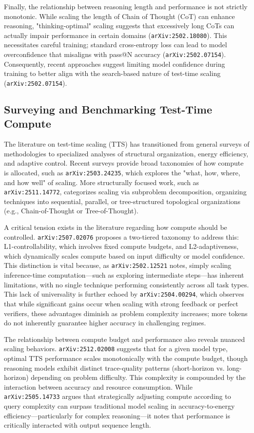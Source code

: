 \documentclass[11pt]{article}
\begin{document}
Finally, the relationship between reasoning length and performance is not strictly monotonic. While scaling the length of Chain of Thought (CoT) can enhance reasoning, "thinking-optimal" scaling suggests that excessively long CoTs can actually impair performance in certain domains (\texttt{arXiv:2502.18080}). This necessitates careful training; standard cross-entropy loss can lead to model overconfidence that misaligns with pass@N accuracy (\texttt{arXiv:2502.07154}). Consequently, recent approaches suggest limiting model confidence during training to better align with the search-based nature of test-time scaling (\texttt{arXiv:2502.07154}).

\subsection{Surveying and Benchmarking Test-Time Compute}

The literature on test-time scaling (TTS) has transitioned from general surveys of methodologies to specialized analyses of structural organization, energy efficiency, and adaptive control. Recent surveys provide broad taxonomies of how compute is allocated, such as \texttt{arXiv:2503.24235}, which explores the "what, how, where, and how well" of scaling. More structurally focused work, such as \texttt{arXiv:2511.14772}, categorizes scaling via subproblem decomposition, organizing techniques into sequential, parallel, or tree-structured topological organizations (e.g., Chain-of-Thought or Tree-of-Thought).

A critical tension exists in the literature regarding how compute should be controlled. \texttt{arXiv:2507.02076} proposes a two-tiered taxonomy to address this: L1-controllability, which involves fixed compute budgets, and L2-adaptiveness, which dynamically scales compute based on input difficulty or model confidence. This distinction is vital because, as \texttt{arXiv:2502.12521} notes, simply scaling inference-time computation—such as exploring intermediate steps—has inherent limitations, with no single technique performing consistently across all task types. This lack of universality is further echoed by \texttt{arXiv:2504.00294}, which observes that while significant gains occur when scaling with strong feedback or perfect verifiers, these advantages diminish as problem complexity increases; more tokens do not inherently guarantee higher accuracy in challenging regimes.

The relationship between compute budget and performance also reveals nuanced scaling behaviors. \texttt{arXiv:2512.02008} suggests that for a given model type, optimal TTS performance scales monotonically with the compute budget, though reasoning models exhibit distinct trace-quality patterns (short-horizon vs. long-horizon) depending on problem difficulty. This complexity is compounded by the interaction between accuracy and resource consumption. While \texttt{arXiv:2505.14733} argues that strategically adjusting compute according to query complexity can surpass traditional model scaling in accuracy-to-energy efficiency—particularly for complex reasoning—it notes that performance is critically interacted with output sequence length.
\end{document}
